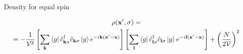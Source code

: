 \begin{frame}{Density for equal spin}

  \begin{equation*}
        \begin{gathered}
      \rho(\textbf{x}', \sigma) = \\ =  -\frac{1}{\mathcal{V}^2} \left [
      \sum_{\textbf{k}}
      \bra{g} \hat{c}_{\textbf{k}\sigma}^{\dagger} \hat{c}_{\textbf{k}\sigma}\ket{g}e^{-i\textbf{k}(\textbf{x}' - \textbf{x})}
      \right] \left [
      \sum_{\textbf{l}}\bra{g} \hat{c}_{\textbf{l}\sigma}^\dagger  \hat{c}_{\textbf{l}\sigma} \ket{g}
      e^{-i\textbf{l}(\textbf{x}' - \textbf{x})} \right]
      + \left ( \frac{N}{2\mathcal{V}}\right )^2
    \end{gathered}
  \end{equation*}
\end{frame}
